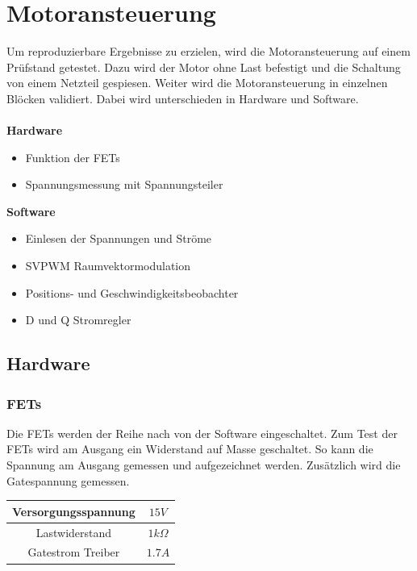 
\section{Motoransteuerung} \label{ValidMotoransteuerung}
Um reproduzierbare Ergebnisse zu erzielen, wird die Motoransteuerung auf einem Prüfstand getestet. Dazu wird der Motor ohne Last befestigt und die Schaltung von einem Netzteil gespiesen. Weiter wird die Motoransteuerung in einzelnen Blöcken validiert. Dabei wird unterschieden in Hardware und Software.\\
\\
\textbf{Hardware}
\begin{itemize}
	\item Funktion der FETs
	\item Spannungsmessung mit Spannungsteiler
\end{itemize}
\textbf{Software}
\begin{itemize}
	\item Einlesen der Spannungen und Ströme
	\item SVPWM Raumvektormodulation
	\item Positions- und Geschwindigkeitsbeobachter
	\item D und Q Stromregler
\end{itemize}

\subsection*{Hardware}
\subsubsection*{FETs}
Die FETs werden der Reihe nach von der Software eingeschaltet. Zum Test der FETs wird am Ausgang ein Widerstand auf Masse geschaltet. So kann die Spannung am Ausgang gemessen und aufgezeichnet werden. Zusätzlich wird die Gatespannung gemessen.

\begin{center}
	\begin{tabular}{|c|c|}
		\hline 
		Versorgungsspannung & $15V$ \\ \hline
		Lastwiderstand & $1k\Omega$ \\ \hline
		Gatestrom Treiber & $1.7A$ \\ \hline
	\end{tabular} 
	\label{tab:fetmessbed}
\end{center}

